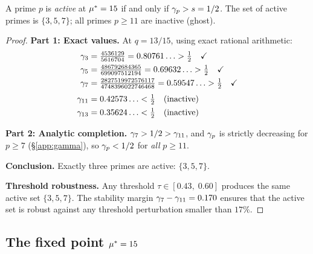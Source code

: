 \documentclass[12pt,a4paper]{article}
\begin{document}
\begin{theorembox}
A prime $p$ is \emph{active} at ${\mu^{*}} = 15$ if and only if
$\gamma_{p} > s = 1/2$. The set of active primes is $\{3, 5, 7\}$;
all primes $p \geq 11$ are inactive (ghost).

\begin{proof}
\textbf{Part 1: Exact values.}
At $q = 13/15$, using exact rational arithmetic:
\begin{align*}
\gamma_{3} &= \tfrac{4536129}{5616704} = 0.80761\ldots > \tfrac{1}{2} \quad \checkmark \\
\gamma_{5} &= \tfrac{486792684365}{699097512194} = 0.69632\ldots > \tfrac{1}{2} \quad \checkmark \\
\gamma_{7} &= \tfrac{2827519972576117}{4748396022746468} = 0.59547\ldots > \tfrac{1}{2} \quad \checkmark \\[3pt]
\gamma_{11} &= 0.42573\ldots < \tfrac{1}{2} \quad \text{(inactive)} \\
\gamma_{13} &= 0.35624\ldots < \tfrac{1}{2} \quad \text{(inactive)}
\end{align*}

\textbf{Part 2: Analytic completion.}
$\gamma_{7} > 1/2 > \gamma_{11}$, and $\gamma_{p}$ is strictly decreasing
for $p \geq 7$ (\S\ref{app:gamma}), so $\gamma_{p} < 1/2$ for
\emph{all} $p \geq 11$.

\textbf{Conclusion.}
Exactly three primes are active: $\{3, 5, 7\}$.

\medskip\noindent
\textbf{Threshold robustness.}
Any threshold $\tau \in [0.43,\; 0.60]$ produces the same active set
$\{3, 5, 7\}$. The stability margin
$\gamma_{7} - \gamma_{11} = 0.170$ ensures that the active set is robust
against any threshold perturbation smaller than $17\%$.
\end{proof}
\end{theorembox}

\subsection{The fixed point ${\mu^{*}} = 15$}
\label{app:fixed_point}
\end{document}
